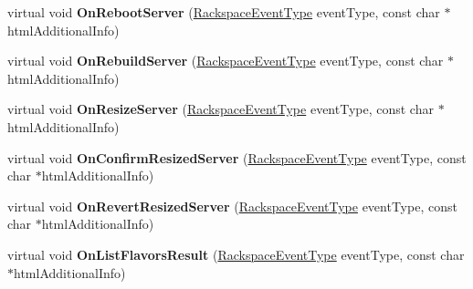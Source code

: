 \begin{DoxyCompactItemize}
\item 
\hypertarget{class_rak_net_1_1_rackspace_event_callback___default_aefa4d746397276e8941192286cfede40}{virtual void {\bfseries On\-Reboot\-Server} (\hyperlink{namespace_rak_net_a120cf6e1a0904cff45269f14c3c4c289}{Rackspace\-Event\-Type} event\-Type, const char $\ast$html\-Additional\-Info)}\label{class_rak_net_1_1_rackspace_event_callback___default_aefa4d746397276e8941192286cfede40}

\item 
\hypertarget{class_rak_net_1_1_rackspace_event_callback___default_adf6a73dfea8e4572d99e252b375f669c}{virtual void {\bfseries On\-Rebuild\-Server} (\hyperlink{namespace_rak_net_a120cf6e1a0904cff45269f14c3c4c289}{Rackspace\-Event\-Type} event\-Type, const char $\ast$html\-Additional\-Info)}\label{class_rak_net_1_1_rackspace_event_callback___default_adf6a73dfea8e4572d99e252b375f669c}

\item 
\hypertarget{class_rak_net_1_1_rackspace_event_callback___default_ab26154e58129a382a607c0af425d28b1}{virtual void {\bfseries On\-Resize\-Server} (\hyperlink{namespace_rak_net_a120cf6e1a0904cff45269f14c3c4c289}{Rackspace\-Event\-Type} event\-Type, const char $\ast$html\-Additional\-Info)}\label{class_rak_net_1_1_rackspace_event_callback___default_ab26154e58129a382a607c0af425d28b1}

\item 
\hypertarget{class_rak_net_1_1_rackspace_event_callback___default_aba59fe3b7e9cdbb38ab19cfc710f8bc6}{virtual void {\bfseries On\-Confirm\-Resized\-Server} (\hyperlink{namespace_rak_net_a120cf6e1a0904cff45269f14c3c4c289}{Rackspace\-Event\-Type} event\-Type, const char $\ast$html\-Additional\-Info)}\label{class_rak_net_1_1_rackspace_event_callback___default_aba59fe3b7e9cdbb38ab19cfc710f8bc6}

\item 
\hypertarget{class_rak_net_1_1_rackspace_event_callback___default_a7248a6d4b67ed42df147379ba56cf246}{virtual void {\bfseries On\-Revert\-Resized\-Server} (\hyperlink{namespace_rak_net_a120cf6e1a0904cff45269f14c3c4c289}{Rackspace\-Event\-Type} event\-Type, const char $\ast$html\-Additional\-Info)}\label{class_rak_net_1_1_rackspace_event_callback___default_a7248a6d4b67ed42df147379ba56cf246}

\item 
\hypertarget{class_rak_net_1_1_rackspace_event_callback___default_ae43c9c1723fa3f47b3a62d91085bbcc9}{virtual void {\bfseries On\-List\-Flavors\-Result} (\hyperlink{namespace_rak_net_a120cf6e1a0904cff45269f14c3c4c289}{Rackspace\-Event\-Type} event\-Type, const char $\ast$html\-Additional\-Info)}\label{class_rak_net_1_1_rackspace_event_callback___default_ae43c9c1723fa3f47b3a62d91085bbcc9}


\end{DoxyCompactItemize}
